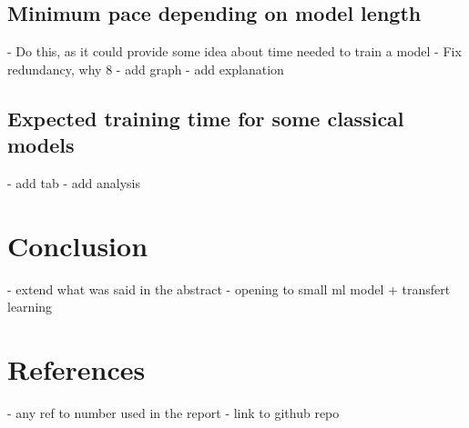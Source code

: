 \documentclass{article}
\begin{document}
\subsection{Minimum pace depending on model length}
- Do this, as it could provide some idea about time needed to train a model
- Fix redundancy, why 8
- add graph
- add explanation
\subsection{Expected training time for some classical models}
- add tab
- add analysis
\section{Conclusion}
- extend what was said in the abstract
- opening to small ml model + transfert learning
\section{References}
- any ref to number used in the report
- link to github repo
\end{document}
